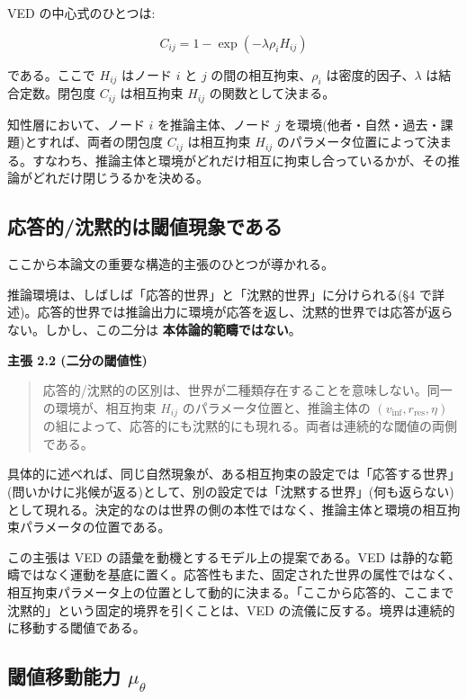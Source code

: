 VED の中心式のひとつは:

\[
C_{ij} = 1 - \exp(-\lambda \rho_i H_{ij})
\]

である。ここで $H_{ij}$ はノード $i$ と $j$ の間の相互拘束、$\rho_i$ は密度的因子、$\lambda$ は結合定数。閉包度 $C_{ij}$ は相互拘束 $H_{ij}$ の関数として決まる。

知性層において、ノード $i$ を推論主体、ノード $j$ を環境(他者・自然・過去・課題)とすれば、両者の閉包度 $C_{ij}$ は相互拘束 $H_{ij}$ のパラメータ位置によって決まる。すなわち、推論主体と環境がどれだけ相互に拘束し合っているかが、その推論がどれだけ閉じうるかを決める。

\bigskip


\subsection{応答的/沈黙的は閾値現象である}


ここから本論文の重要な構造的主張のひとつが導かれる。

推論環境は、しばしば「応答的世界」と「沈黙的世界」に分けられる(\S{}4 で詳述)。応答的世界では推論出力に環境が応答を返し、沈黙的世界では応答が返らない。しかし、この二分は \textbf{本体論的範疇ではない}。

\textbf{主張 2.2 (二分の閾値性)}

\begin{quote}
応答的/沈黙的の区別は、世界が二種類存在することを意味しない。同一の環境が、相互拘束 $H_{ij}$ のパラメータ位置と、推論主体の $(v_{\text{inf}}, r_{\text{res}}, \eta)$ の組によって、応答的にも沈黙的にも現れる。両者は連続的な閾値の両側である。
\end{quote}


具体的に述べれば、同じ自然現象が、ある相互拘束の設定では「応答する世界」(問いかけに兆候が返る)として、別の設定では「沈黙する世界」(何も返らない)として現れる。決定的なのは世界の側の本性ではなく、推論主体と環境の相互拘束パラメータの位置である。

この主張は VED の語彙を動機とするモデル上の提案である。VED は静的な範疇ではなく運動を基底に置く。応答性もまた、固定された世界の属性ではなく、相互拘束パラメータ上の位置として動的に決まる。「ここから応答的、ここまで沈黙的」という固定的境界を引くことは、VED の流儀に反する。境界は連続的に移動する閾値である。

\bigskip


\subsection{閾値移動能力 $\mu_\theta$}


